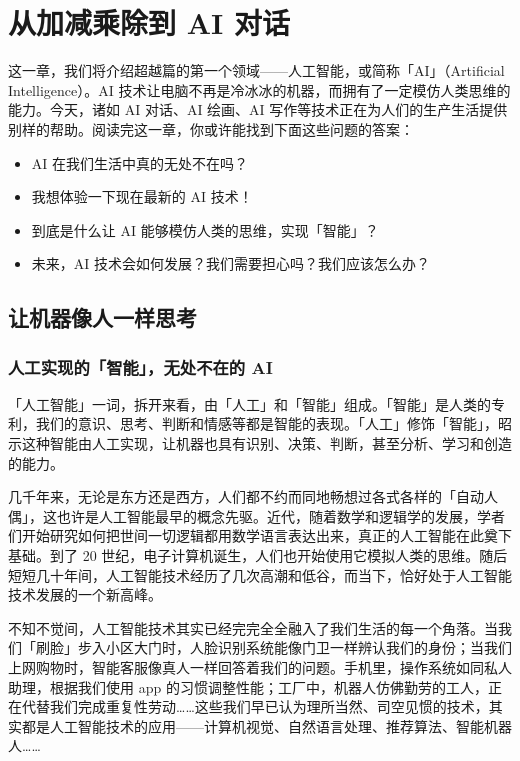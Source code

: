 \chapter{从加减乘除到 AI 对话}
\label{cha:bring-intelligence-to-machines}

\begin{intro}
  这一章，我们将介绍超越篇的第一个领域——人工智能，或简称「AI」（Artificial Intelligence）。AI 技术让电脑不再是冷冰冰的机器，而拥有了一定模仿人类思维的能力。今天，诸如 AI 对话、AI 绘画、AI 写作等技术正在为人们的生产生活提供别样的帮助。阅读完这一章，你或许能找到下面这些问题的答案：
  \begin{itemize}
    \item AI 在我们生活中真的无处不在吗？
    \item 我想体验一下现在最新的 AI 技术！
    \item 到底是什么让 AI 能够模仿人类的思维，实现「智能」？
    \item 未来，AI 技术会如何发展？我们需要担心吗？我们应该怎么办？
  \end{itemize}
\end{intro}

\section{让机器像人一样思考}

\subsection{人工实现的「智能」，无处不在的 AI}

「人工智能」一词，拆开来看，由「人工」和「智能」组成。「智能」是人类的专利，我们的意识、思考、判断和情感等都是智能的表现。「人工」修饰「智能」，昭示这种智能由人工实现，让机器也具有识别、决策、判断，甚至分析、学习和创造的能力。

几千年来，无论是东方还是西方，人们都不约而同地畅想过各式各样的「自动人偶」，这也许是人工智能最早的概念先驱。近代，随着数学和逻辑学的发展，学者们开始研究如何把世间一切逻辑都用数学语言表达出来，真正的人工智能在此奠下基础。到了 20 世纪，电子计算机诞生，人们也开始使用它模拟人类的思维。随后短短几十年间，人工智能技术经历了几次高潮和低谷，而当下，恰好处于人工智能技术发展的一个新高峰。

不知不觉间，人工智能技术其实已经完完全全融入了我们生活的每一个角落。当我们「刷脸」步入小区大门时，人脸识别系统能像门卫一样辨认我们的身份；当我们上网购物时，智能客服像真人一样回答着我们的问题。手机里，操作系统如同私人助理，根据我们使用 app 的习惯调整性能；工厂中，机器人仿佛勤劳的工人，正在代替我们完成重复性劳动……这些我们早已认为理所当然、司空见惯的技术，其实都是人工智能技术的应用——计算机视觉、自然语言处理、推荐算法、智能机器人……

